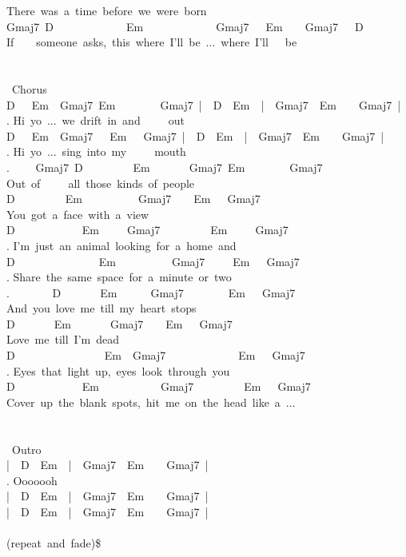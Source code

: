 {There\ was\ a\ time\ before\ we\ were\ born\\
Gmaj7\ D\ \ \ \ \ \ \ \ \ \ \ \ \ Em\ \ \ \ \ \ \ \ \ \ \ \ \ Gmaj7\ \ \ Em\ \ \ \ Gmaj7\ \lbrack\ \ D\ \rbrack\\
If\ \ \ \ someone\ asks,\ this\ where\ I'll\ be\ ...\ where\ I'll\ \ \ be\\
\\
\\
\lbrack\ Chorus\rbrack\\
D\ \ \ Em\ \ Gmaj7\ Em\ \ \ \ \ \ \ \ Gmaj7\ |\ \ D\ \ Em\ \ |\ \ Gmaj7\ \ Em\ \ \ \ Gmaj7\ |\\
. Hi\ yo\ ...\ we\ drift\ in\ and\ \ \ \ \ out\\
D\ \ \ Em\ \ Gmaj7\ \ \ Em\ \ \ Gmaj7\ |\ \ D\ \ Em\ \ |\ \ Gmaj7\ \ Em\ \ \ \ Gmaj7\ |\\
. Hi\ yo\ ...\ sing\ into\ my\ \ \ \ \ mouth\\
. \ \ \ \ Gmaj7\ D\ \ \ \ \ \ \ \ \ Em\ \ \ \ \ \ \ Gmaj7\ Em\ \ \ \ \ \ \ \ Gmaj7\\
Out\ of\ \ \ \ \ all\ those\ kinds\ of\ people\\
D\ \ \ \ \ \ \ \ \ Em\ \ \ \ \ \ \ \ \ \ Gmaj7\ \ \ \ Em\ \ \ Gmaj7\\
You\ got\ a\ face\ with\ a\ view\\
D\ \ \ \ \ \ \ \ \ \ \ \ Em\ \ \ \ \ Gmaj7\ \ \ \ \ \ \ \ \ Em\ \ \ \ \ Gmaj7\\
. I'm\ just\ an\ animal\ looking\ for\ a\ home\ and\\
D\ \ \ \ \ \ \ \ \ \ \ \ \ \ \ Em\ \ \ \ \ \ \ \ \ \ Gmaj7\ \ \ \ \ Em\ \ \ Gmaj7\\
. Share\ the\ same\ space\ for\ a\ minute\ or\ two\\
. \ \ \ \ \ \ \ D\ \ \ \ \ \ \ Em\ \ \ \ \ \ Gmaj7\ \ \ \ \ \ \ \ Em\ \ \ Gmaj7\\
And\ you\ love\ me\ till\ my\ heart\ stops\\
D\ \ \ \ \ \ \ Em\ \ \ \ \ \ \ Gmaj7\ \ \ \ Em\ \ \ Gmaj7\\
Love\ me\ till\ I'm\ dead\\
D\ \ \ \ \ \ \ \ \ \ \ \ \ \ \ \ Em\ \ Gmaj7\ \ \ \ \ \ \ \ \ \ \ \ \ Em\ \ \ Gmaj7\\
. Eyes\ that\ light\ up,\ eyes\ look\ through\ you\\
D\ \ \ \ \ \ \ \ \ \ \ \ Em\ \ \ \ \ \ \ \ \ \ \ Gmaj7\ \ \ \ \ \ \ \ \ Em\ \ \ Gmaj7\\
Cover\ up\ the\ blank\ spots,\ hit\ me\ on\ the\ head\ like\ a\ ...\\
\\
\\
\lbrack\ Outro\rbrack\\
|\ \ D\ \ Em\ \ |\ \ Gmaj7\ \ Em\ \ \ \ Gmaj7\ |\\
. Ooooooh\\
|\ \ D\ \ Em\ \ |\ \ Gmaj7\ \ Em\ \ \ \ Gmaj7\ |\\
|\ \ D\ \ Em\ \ |\ \ Gmaj7\ \ Em\ \ \ \ Gmaj7\ |\\
\\
(repeat\ and\ fade)\$}
